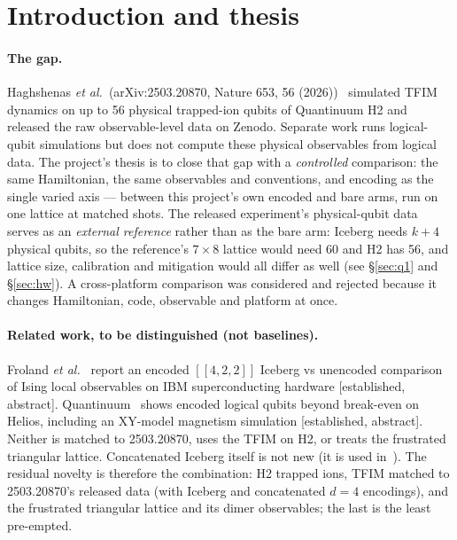 \documentclass[11pt,a4paper]{article}
\newcommand{\tg}[1]{\textsf{\small[#1]}}
\begin{document}
\tableofcontents

\section{Introduction and thesis}\label{sec:intro}

\paragraph{The gap.} Haghshenas \emph{et al.}\ (arXiv:2503.20870, Nature 653, 56 (2026))~\cite{haghshenas}
simulated TFIM dynamics on up to 56 physical trapped-ion qubits of Quantinuum H2 and released the raw
observable-level data on Zenodo. Separate work runs logical-qubit simulations but does not compute
these physical observables from logical data. The project's thesis is to close that gap with a
\emph{controlled} comparison: the same Hamiltonian, the same observables and conventions, and encoding as
the single varied axis --- between this project's own encoded and bare arms, run on one lattice at matched
shots. The released experiment's physical-qubit data serves as an \emph{external reference} rather than as
the bare arm: Iceberg needs $k+4$ physical qubits, so the reference's $7\times8$ lattice would need 60 and H2
has 56, and lattice size, calibration and mitigation would all differ as well (see \S\ref{sec:q1} and
\S\ref{sec:hw}).
A cross-platform comparison was considered and rejected because it changes Hamiltonian, code, observable
and platform at once.

\paragraph{Related work, to be distinguished (not baselines).}
Froland \emph{et al.}~\cite{froland} report an encoded $[[4,2,2]]$ Iceberg vs unencoded comparison of Ising
local observables on IBM superconducting hardware \tg{established, abstract}. Quantinuum~\cite{helios} shows encoded logical
qubits beyond break-even on Helios, including an XY-model magnetism simulation \tg{established, abstract}. Neither is
matched to 2503.20870, uses the TFIM on H2, or treats the frustrated triangular lattice. Concatenated Iceberg
itself is not new (it is used in~\cite{helios}). The residual novelty is therefore the combination: H2 trapped ions,
TFIM matched to 2503.20870's released data (with Iceberg and concatenated $d=4$ encodings), and the frustrated
triangular lattice and its dimer observables; the last is the least pre-empted.
\end{document}
